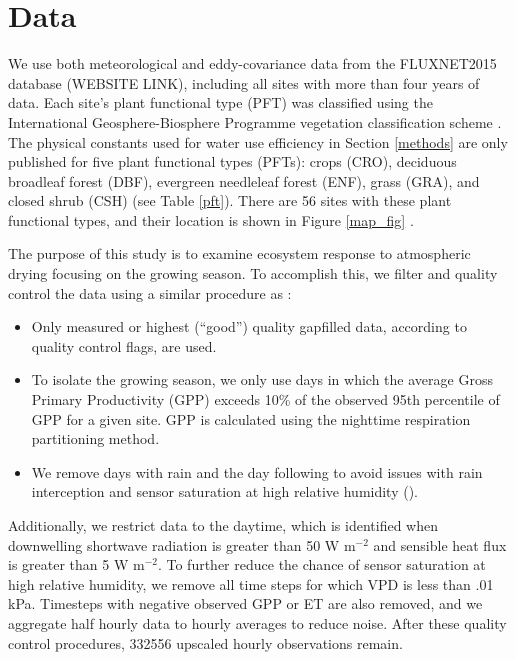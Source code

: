 \documentclass[draft,linenumbers]{agujournal}
\begin{document}
\section{Data}
\label{data}
We use both meteorological and eddy-covariance data from the FLUXNET2015 database (WEBSITE LINK), including all sites with more than four years of data. Each site's plant functional type (PFT) was classified using the International Geosphere-Biosphere Programme vegetation classification scheme \citep{Loveland_1999}. The physical constants used for water use efficiency in Section \ref{methods} are only published for five plant functional types (PFTs): crops (CRO), deciduous broadleaf forest (DBF), evergreen needleleaf forest (ENF), grass (GRA), and closed shrub (CSH) (see Table \ref{pft}). There are 56 sites with these plant functional types, and their location is shown in  Figure \ref{map_fig} .

The purpose of this study is to examine ecosystem response to atmospheric drying focusing on the growing season. To accomplish this, we filter and quality control the data using a similar procedure as \cite{Zhou_2015}:
\begin{itemize}
\item Only measured or highest (``good'') quality gapfilled data, according to quality control flags, are used.
\item To isolate the growing season, we only use days in which the average Gross Primary Productivity (GPP) exceeds 10\% of the observed 95th percentile of GPP for a given site. GPP is calculated using the nighttime respiration partitioning method.
\item We remove days with rain and the day following to avoid issues with rain interception and sensor saturation at high relative humidity (\cite{MEDLYN_2011}).
\end{itemize}
Additionally, we restrict data to the daytime, which is identified when downwelling shortwave radiation is greater than 50 W m$^{-2}$ and sensible heat flux is greater than 5 W m$^{-2}$. To further reduce the chance of sensor saturation at high relative humidity, we remove all time steps for which VPD is less than .01 kPa. Timesteps with negative observed GPP or ET are also removed, and we aggregate half hourly data to hourly averages to reduce noise. After these quality control procedures, 332556 upscaled hourly observations remain. 
\end{document}
